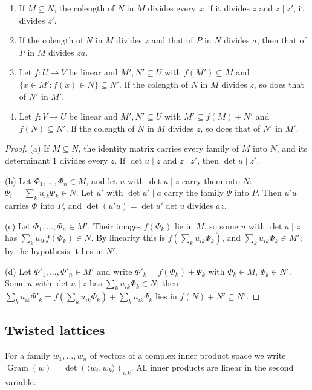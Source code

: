 \begin{lemma}\label{lem:colength}
\begin{enumerate}[label=\textup{(\alph*)}]
\item If $M\subseteq N$, the colength of $N$ in $M$ divides every $z$; if it divides $z$ and $z\mid z'$,
it divides $z'$.
\item If the colength of $N$ in $M$ divides $z$ and that of $P$ in $N$ divides $a$, then that of $P$
in $M$ divides $za$.
\item Let $f\colon U\to V$ be linear and $M',N'\subseteq U$ with $f(M')\subseteq M$ and
$\{x\in M':f(x)\in N\}\subseteq N'$. If the colength of $N$ in $M$ divides $z$, so does that of $N'$
in $M'$.
\item Let $f\colon V\to U$ be linear and $M',N'\subseteq U$ with $M'\subseteq f(M)+N'$ and
$f(N)\subseteq N'$. If the colength of $N$ in $M$ divides $z$, so does that of $N'$ in $M'$.
\end{enumerate}
\end{lemma}

\begin{proof}
(a) If $M\subseteq N$, the identity matrix carries every family of $M$ into $N$, and its determinant $1$ divides every $z$. If $\det u\mid z$ and $z\mid z'$, then $\det u\mid z'$.

(b) Let $\Phi_1,\dots,\Phi_n\in M$, and let $u$ with $\det u\mid z$ carry them into $N$: $\Psi_i=\sum_ku_{ik}\Phi_k\in N$. Let $u'$ with $\det u'\mid a$ carry the family $\Psi$ into $P$. Then $u'u$ carries $\Phi$ into $P$, and $\det(u'u)=\det u'\det u$ divides $az$.

(c) Let $\Phi_1,\dots,\Phi_n\in M'$. Their images $f(\Phi_k)$ lie in $M$, so some $u$ with $\det u\mid z$ has $\sum_ku_{ik}f(\Phi_k)\in N$. By linearity this is $f(\sum_ku_{ik}\Phi_k)$, and $\sum_ku_{ik}\Phi_k\in M'$; by the hypothesis it lies in $N'$.

(d) Let $\Phi'_1,\dots,\Phi'_n\in M'$ and write $\Phi'_k=f(\Phi_k)+\Psi_k$ with $\Phi_k\in M$, $\Psi_k\in N'$. Some $u$ with $\det u\mid z$ has $\sum_ku_{ik}\Phi_k\in N$; then $\sum_ku_{ik}\Phi'_k=f(\sum_ku_{ik}\Phi_k)+\sum_ku_{ik}\Psi_k$ lies in $f(N)+N'\subseteq N'$.
\end{proof}

\subsection{Twisted lattices}\label{ss:twisted-lattices}
For a family $w_1,\dots,w_n$ of vectors of a complex inner product space we write
$\operatorname{Gram}(w)=\det(\langle w_i,w_k\rangle)_{i,k}$. All inner products are linear in the
second variable.

